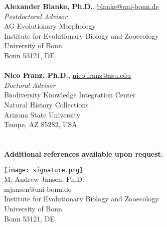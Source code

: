 \documentclass[12pt,a4paper]{article}
\begin{document}
	\textbf{Alexander Blanke, Ph.D.}, \href{mailto:blanke@uni-bonn.de}{blanke@uni-bonn.de}\\
	\textit{Postdoctoral Advisor}\\
	AG Evolutionary Morphology\\
	Institute for Evolutionary Biology and Zooecology\\
	University of Bonn\\
	Bonn 53121, DE\\
	\\
	\textbf{Nico Franz, Ph.D.}, \href{mailto:nico.franz@asu.edu}{nico.franz@asu.edu}\\
	\textit{Doctoral Advisor}\\
	Biodiversity Knowledge Integration Center\\
	Natural History Collections\\
	Arizona State University\\
	Tempe, AZ 85282, USA\\
	\\
	\\
	\textbf{Additional references available upon request.}

\vspace*{0.25cm}
\texttt{[image: signature.png]}\\
M. Andrew Jansen, Ph.D.\\
mjansen@uni-bonn.de\\
Institute for Evolutionary Biology and Zooecology\\
University of Bonn\\
Bonn 53121, DE
\end{document}
